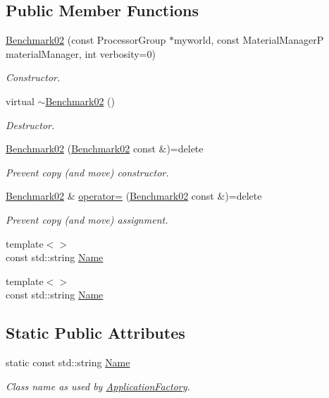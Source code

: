 \subsection*{Public Member Functions}
\begin{DoxyCompactItemize}
\item 
\hyperlink{classUintah_1_1PhaseField_1_1Benchmark02_acec272491b8fca70d195c50efbf21278}{Benchmark02} (const Processor\+Group $\ast$myworld, const Material\+ManagerP material\+Manager, int verbosity=0)
\begin{DoxyCompactList}\small\item\em Constructor. \end{DoxyCompactList}\item 
virtual \hyperlink{classUintah_1_1PhaseField_1_1Benchmark02_a04af887474930975698c2427f90d1d53}{$\sim$\+Benchmark02} ()
\begin{DoxyCompactList}\small\item\em Destructor. \end{DoxyCompactList}\item 
\hyperlink{classUintah_1_1PhaseField_1_1Benchmark02_a330d6a1af2b9052829e2952e4a69f904}{Benchmark02} (\hyperlink{classUintah_1_1PhaseField_1_1Benchmark02}{Benchmark02} const \&)=delete
\begin{DoxyCompactList}\small\item\em Prevent copy (and move) constructor. \end{DoxyCompactList}\item 
\hyperlink{classUintah_1_1PhaseField_1_1Benchmark02}{Benchmark02} \& \hyperlink{classUintah_1_1PhaseField_1_1Benchmark02_a53bd0c07c069db978fd2e993e451ead8}{operator=} (\hyperlink{classUintah_1_1PhaseField_1_1Benchmark02}{Benchmark02} const \&)=delete
\begin{DoxyCompactList}\small\item\em Prevent copy (and move) assignment. \end{DoxyCompactList}\item 
{\footnotesize template$<$$>$ }\\const std\+::string \hyperlink{classUintah_1_1PhaseField_1_1Benchmark02_a59887a97ce81684603a82b37279fb180}{Name}
\item 
{\footnotesize template$<$$>$ }\\const std\+::string \hyperlink{classUintah_1_1PhaseField_1_1Benchmark02_aeba1af4c807d2e6d6bc8c678a40fa92c}{Name}
\end{DoxyCompactItemize}
\subsection*{Static Public Attributes}
\begin{DoxyCompactItemize}
\item 
static const std\+::string \hyperlink{classUintah_1_1PhaseField_1_1Benchmark02_a929f49867bffd55ae69052b8150dea5a}{Name}
\begin{DoxyCompactList}\small\item\em Class name as used by \hyperlink{classUintah_1_1PhaseField_1_1ApplicationFactory}{Application\+Factory}. \end{DoxyCompactList}\end{DoxyCompactItemize}
